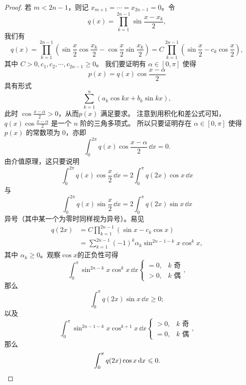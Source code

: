 \begin{quizb}
\begin{enumerate}
\begin{proof}
若 $m<2n-1$，则记 $x_{m+1}=\cdots=x_{2n-1}=0$。令
\[q(x)=\prod_{k=1}^{2n-1} \sin \frac{x-x_k}{2},\]
我们有
\[q(x)=\prod_{k=1}^{2n-1}\left(\sin \frac{x}{2} \cos \frac{x_k}{2}-\cos \frac{x}{2} \sin \frac{x_k}{2}\right)
=C \prod_{k=1}^{2n-1}\left(\sin \frac{x}{2}-c_k \cos \frac{x}{2}\right),\]
其中 $C>0, c_1, c_2, \cdots, c_{2n-1} \geqslant 0$。
我们要证明有 $\alpha \in[0,\pi]$ 使得 
\[p(x)=q(x) \cos \frac{x-\alpha}{2}\]
具有形式
\[\sum_{k=1}^n\left(a_k \cos kx+b_k \sin kx\right),\]
此时 \(\cos \frac{x-\alpha}{2}>0\)，从而$p(x)$ 满足要求。
注意到用积化和差公式可知，\(q(x) \cos \frac{x-\alpha}{2}\) 是一个 $n$ 阶的三角多项式。
所以只要证明存在 $\alpha \in[0,\pi]$ 使得 $p(x)$ 的常数项为 $0$，亦即
\[\int_0^{2\pi} q(x) \cos \frac{x-\alpha}{2}\,\dd x=0.\]
由介值原理，这只要说明
\[\int_0^{2\pi} q(x) \cos \frac{x}{2}\,\dd x=2 \int_0^\pi q(2x) \cos x\,\dd x\]
与
\[\int_0^{2\pi} q(x) \sin \frac{x}{2}\,\dd x=2 \int_0^\pi q(2x) \sin x\,\dd x\]
异号（其中某一个为零时同样视为异号）。易见
\begin{align*}
q(2 x) & =C \prod_{k=1}^{2n-1}\left(\sin x-c_k \cos x\right) \\
& =\sum_{k=1}^{2n-1}(-1)^k \alpha_k \sin^{2n-1-k}\!x \cos^k\!x,
\end{align*}
其中 $\alpha_k\geqslant0$。观察$\cos x$的正负性可得
\[\int_0^\pi\sin^{2n-k}\!x \cos^{k}\!x\,\dd x
\begin{cases}=0,&k\text{ 奇}\\>0,&k\text{ 偶}\end{cases},\]
那么 \[\int_0^\pi q(2x) \sin x\,\dd x\geqslant0;\]
以及\[\int_0^\pi\sin^{2n-1-k}\!x \cos^{k+1}\!x\,\dd x
\begin{cases}>0,&k\text{ 奇}\\=0,&k\text{ 偶}\end{cases},\]
那么 \[\int_0^\pi q(2x) \cos x\,\mathrm{d} x\leqslant0.\qedhere\]
\end{proof}


\end{enumerate}
\end{quizb}
